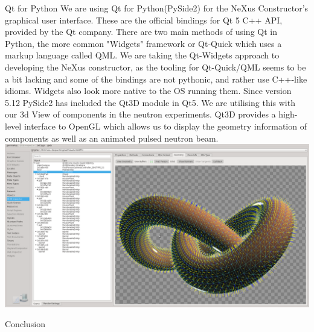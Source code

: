 \documentclass[usenames,dvipsnames]{beamer}
\begin{document}
\begin{frame}[t]
\begin{columns}[t]
\begin{column}{0.47\paperwidth}
\begin{custombox}{Qt for Python}
We are using Qt for Python(PySide2) for the NeXus Constructor's graphical user interface. These are the official bindings for Qt 5 C++ API, provided by the Qt company. 
There are two main methods of using Qt in Python, the more common "Widgets" framework or Qt-Quick which uses a markup language called QML.
We are taking the Qt-Widgets approach to developing the NeXus constructor, as the tooling for Qt-Quick/QML seems to be a bit lacking and some of the bindings are not pythonic, and rather use C++-like idioms. Widgets also look more native to the OS running them. 
Since version 5.12 PySide2 has included the Qt3D module in Qt5. We are utilising this with our 3d View of components in the neutron experiments. Qt3D provides a high-level interface to OpenGL which allows us to display the geometry information of components as well as an animated pulsed neutron beam.
\includegraphics[width=\linewidth]{qt3d.png}
\end{custombox}

\begin{custombox}{Conclusion}
\lipsum[2]
\end{custombox}

\end{column}
\end{columns}
\end{frame}
\end{document}
